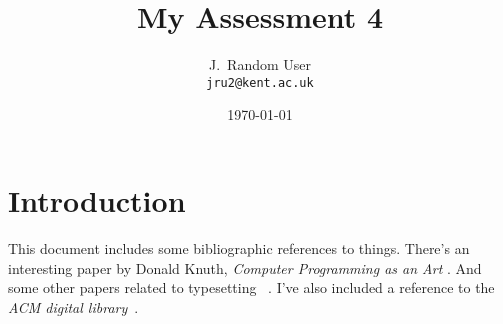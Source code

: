 \documentclass[a4paper,12pt]{article}
\begin{document}
\title{My Assessment 4}
\author{J.~Random User\\{\small\tt jru2@kent.ac.uk}}
\date{\today}

\maketitle
\thispagestyle{empty}

\section{Introduction}
This document includes some bibliographic references
to things.  There's an interesting paper by Donald
Knuth, {\em Computer Programming as an Art} \cite{Knuth:1974}.
And some other papers related to typesetting~%
\cite{Kernighan/Cherry:1975,deAlmeida:2004,Kaufman:1981}.
I've also included a reference to the {\em ACM digital
library}~\cite{DL:2014}.



\end{document}
